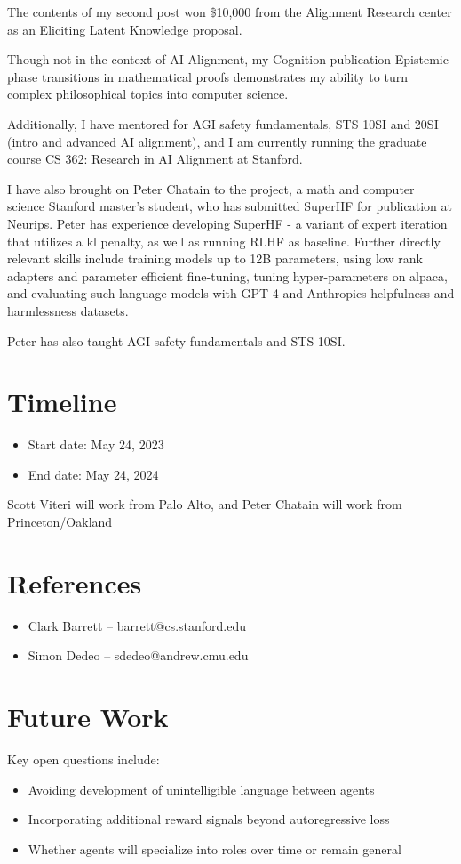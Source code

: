 \documentclass{article}
\begin{document}
The contents of my second post won \$10,000 from the Alignment Research center as an Eliciting Latent Knowledge proposal.

Though not in the context of AI Alignment, my Cognition publication Epistemic phase transitions in mathematical proofs demonstrates my ability to turn complex philosophical topics into computer science.

Additionally, I have mentored for AGI safety fundamentals, STS 10SI and 20SI (intro and advanced AI alignment), and I am currently running the graduate course CS 362: Research in AI Alignment at Stanford.

I have also brought on Peter Chatain to the project, a math and computer science Stanford master's student, who has submitted SuperHF for publication at Neurips. Peter has experience developing SuperHF - a variant of expert iteration that utilizes a kl penalty, as well as running RLHF as baseline. Further directly relevant skills include training models up to 12B parameters, using low rank adapters and parameter efficient fine-tuning, tuning hyper-parameters on alpaca, and evaluating such language models with GPT-4 and Anthropics helpfulness and harmlessness datasets.

Peter has also taught AGI safety fundamentals and STS 10SI.


\section{Timeline}

\begin{itemize}
\item Start date: May 24, 2023
\item End date: May 24, 2024
\end{itemize}

Scott Viteri will work from Palo Alto, and Peter Chatain will work from Princeton/Oakland

\section{References}

\begin{itemize}
\item Clark Barrett -- barrett@cs.stanford.edu
\item Simon Dedeo -- sdedeo@andrew.cmu.edu
\end{itemize}

\section{Future Work}

Key open questions include:

\begin{itemize}
\item Avoiding development of unintelligible language between agents
\item Incorporating additional reward signals beyond autoregressive loss
\item Whether agents will specialize into roles over time or remain general
\end{itemize}
\end{document}
